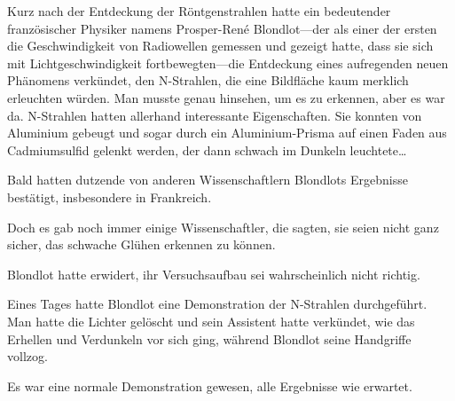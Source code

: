 Kurz nach der Entdeckung der Röntgenstrahlen hatte ein bedeutender französischer Physiker namens Prosper-René Blondlot—der als einer der ersten die Geschwindigkeit von Radiowellen gemessen und gezeigt hatte, dass sie sich mit Lichtgeschwindigkeit fortbewegten—die Entdeckung eines aufregenden neuen Phänomens verkündet, den N-Strahlen, die eine Bildfläche kaum merklich erleuchten würden. Man musste genau hinsehen, um es zu erkennen, aber es war da. N-Strahlen hatten allerhand interessante Eigenschaften. Sie konnten von Aluminium gebeugt und sogar durch ein Aluminium-Prisma auf einen Faden aus Cadmiumsulfid gelenkt werden, der dann schwach im Dunkeln leuchtete…

Bald hatten dutzende von anderen Wissenschaftlern Blondlots Ergebnisse bestätigt, insbesondere in Frankreich.

Doch es gab noch immer einige Wissenschaftler, die sagten, sie seien nicht ganz sicher, das schwache Glühen erkennen zu können.

Blondlot hatte erwidert, ihr Versuchsaufbau sei wahrscheinlich nicht richtig.

Eines Tages hatte Blondlot eine Demonstration der N-Strahlen durchgeführt. Man hatte die Lichter gelöscht und sein Assistent hatte verkündet, wie das Erhellen und Verdunkeln vor sich ging, während Blondlot seine Handgriffe vollzog.

Es war eine normale Demonstration gewesen, alle Ergebnisse wie erwartet.

